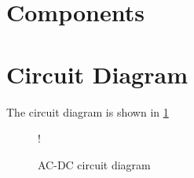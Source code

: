 \documentclass[journal,12pt,twocolumn]{IEEEtran}
\begin{document}
\section{Components}
\begin{table}[!h]
\centering

\caption{}
\label{table:components}
\end{table}
\section{Circuit Diagram}
The circuit diagram is shown in \ref{fig1}
\begin{figure}[!h]
\centering
\resizebox {\columnwidth} {!} {

}
\caption{AC-DC circuit diagram} 
\label{fig1}
\end{figure}


\end{document}
